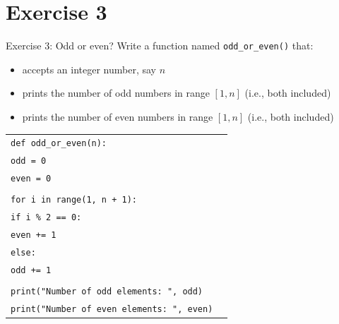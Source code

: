 \documentclass[t,handout,9pt]{beamer}
\begin{document}
\section{Exercise 3}
\begin{frame}{Exercise 3: Odd or even?}
\vfill
Write a function named \texttt{odd\_or\_even()} that:
\begin{itemize}
	\item accepts an integer number, say $n$
	\item prints the number of odd numbers in range $[1,n]$ (i.e., both included)
	\item prints the number of even numbers in range $[1,n]$ (i.e., both included)
\end{itemize}
\vfill
\end{frame}
%
\begin{frame}
	\vfill
		\begin{table}[]
		  \begin{flushleft}
		  \begin{tabular}{ll}
		  \texttt{def odd\_or\_even(n):} &  \\
		  \texttt{\quad odd = 0}        & \\
		  \texttt{\quad even = 0}        & \\
		  \texttt{} &  \\
		  \texttt{\quad for i in range(1, n + 1):}        & \\
		  \texttt{\quad\quad if i \% 2 == 0:}        & \\
		  \texttt{\quad\quad\quad even += 1} &  \\
		  \texttt{\quad\quad else:} &  \\
		  \texttt{\quad\quad\quad odd += 1} &  \\
		  \texttt{} &  \\
		  \texttt{\quad print("Number of odd elements: ", odd)} &  \\
		  \texttt{\quad print("Number of even elements: ", even)} &  \\
		  \end{tabular}
		  \end{flushleft}
		\end{table}
	\vfill
\end{frame}
\end{document}
